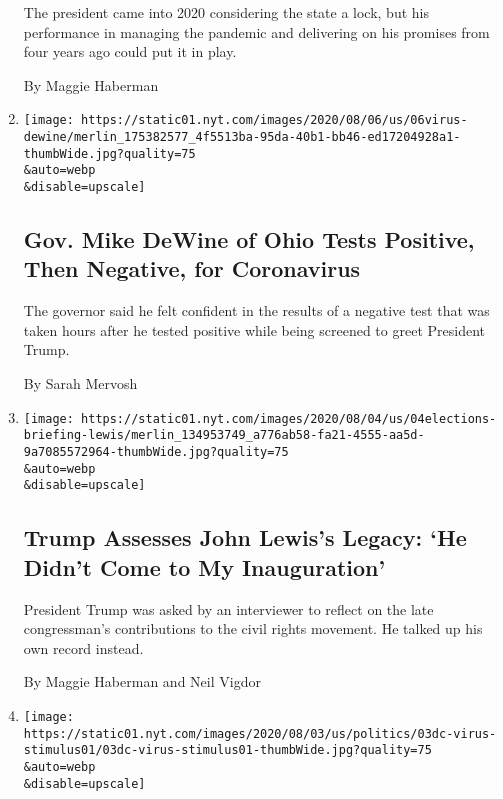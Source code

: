 \begin{enumerate}
  The president came into 2020 considering the state a lock, but his
  performance in managing the pandemic and delivering on his promises
  from four years ago could put it in play.

  By Maggie Haberman
\item
  \href{/2020/08/06/us/mike-dewine-coronavirus.html}{}

  \texttt{[image: https://static01.nyt.com/images/2020/08/06/us/06virus-dewine/merlin\_175382577\_4f5513ba-95da-40b1-bb46-ed17204928a1-thumbWide.jpg?quality=75\\\&auto=webp\\\&disable=upscale]}

  \hypertarget{gov-mike-dewine-of-ohio-tests-positive-then-negative-for-coronavirus}{%
  \subsection{Gov. Mike DeWine of Ohio Tests Positive, Then Negative,
  for
  Coronavirus}\label{gov-mike-dewine-of-ohio-tests-positive-then-negative-for-coronavirus}}

  The governor said he felt confident in the results of a negative test
  that was taken hours after he tested positive while being screened to
  greet President Trump.

  By Sarah Mervosh
\item
  \href{/2020/08/04/us/politics/trump-john-lewis-axios.html}{}

  \texttt{[image: https://static01.nyt.com/images/2020/08/04/us/04elections-briefing-lewis/merlin\_134953749\_a776ab58-fa21-4555-aa5d-9a7085572964-thumbWide.jpg?quality=75\\\&auto=webp\\\&disable=upscale]}

  \hypertarget{trump-assesses-john-lewiss-legacy-he-didnt-come-to-my-inauguration}{%
  \subsection{Trump Assesses John Lewis's Legacy: `He Didn't Come to My
  Inauguration'}\label{trump-assesses-john-lewiss-legacy-he-didnt-come-to-my-inauguration}}

  President Trump was asked by an interviewer to reflect on the late
  congressman's contributions to the civil rights movement. He talked up
  his own record instead.

  By Maggie Haberman and Neil Vigdor
\item
  \href{/2020/08/03/us/politics/congress-jobless-aid-talks-trump.html}{}

  \texttt{[image: https://static01.nyt.com/images/2020/08/03/us/politics/03dc-virus-stimulus01/03dc-virus-stimulus01-thumbWide.jpg?quality=75\\\&auto=webp\\\&disable=upscale]}


\end{enumerate}
